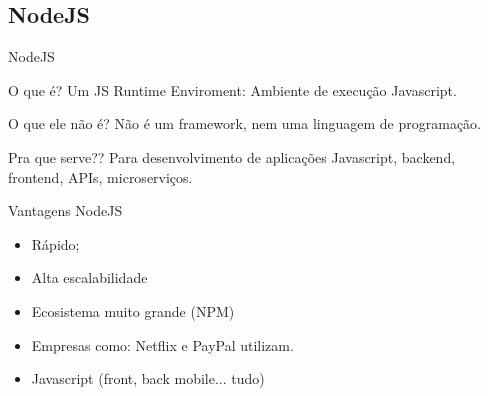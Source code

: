 \documentclass{beamer}
\begin{document}
    \subsection{NodeJS}
    \begin{frame}[label=simmonshall]{NodeJS}

      \begin{block}{O que é?}
        Um \alert{JS Runtime Enviroment}: Ambiente de execução Javascript.
      \end{block}
      \begin{exampleblock}{O que ele não é?}
        Não é um framework, nem uma linguagem de programação.
      \end{exampleblock}
      \begin{alertblock}{Pra que serve??}
        Para desenvolvimento de aplicações Javascript, backend, frontend, APIs, microserviços.
      \end{alertblock}
    \end{frame}
    \begin{frame}[label=proof]{Vantagens NodeJS}
	\begin{itemize}
	\item Rápido;
	\item Alta escalabilidade
	\item Ecosistema muito grande (NPM)
	\item Empresas como: Netflix e PayPal utilizam.
	\item Javascript (front, back mobile... tudo)
	\end{itemize}
    \end{frame}
    
\end{document}
